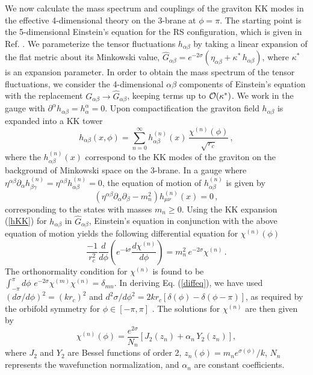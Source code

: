 We now calculate the mass spectrum and couplings of the graviton 
KK modes in the effective 4-dimensional theory on the 3-brane at $\phi = \pi$.  
The starting point is the 5-dimensional Einstein's equation for the RS
configuration, which is given in Ref. \cite{rs1}.  We parameterize the tensor 
fluctuations $h_{\alpha \beta}$ by taking a linear expansion of the flat 
metric about its Minkowski value, $\hat{G}_{\alpha \beta} = e^{-2 \sigma} 
\left(\eta_{\alpha \beta} + \kappa^* \,  h_{\alpha \beta}\right)$,
where $\kappa^*$ is an expansion parameter.  In order to obtain the mass 
spectrum of the tensor fluctuations, we consider the 4-dimensional
$\alpha \beta$ components of Einstein's equation with the replacement 
$G_{\alpha \beta} \to \hat{G}_{\alpha \beta}$,
keeping terms up to $\cal{O}(\kappa^*)$.  We work in the gauge with 
$\partial^\alpha h_{\alpha\beta} = h^\alpha_\alpha = 0$.  Upon compactification
the graviton field $h_{\alpha \beta}$ is expanded into a KK tower
\begin{equation}
h_{\alpha \beta} (x, \phi) = \sum_{n = 0}^\infty h_{\alpha \beta}^{(n)} (x) \, 
\frac{\chi^{(n)}(\phi)}{\sqrt{r_c}}\,,
\label{hKK}
\end{equation} 
where the $h_{\alpha \beta}^{(n)} (x)$ correspond to the KK modes of the 
graviton on the background of Minkowski space on the 3-brane.  In a gauge where 
$\eta^{\alpha \beta} \partial_\alpha h^{(n)}_{\beta \gamma} = 
\eta^{\alpha \beta} h_{\alpha \beta}^{(n)} = 0$, the equation of motion of 
$h_{\alpha \beta}^{(n)}$ is given by
\begin{equation}
\left(\eta^{\alpha \beta} \partial_\alpha \partial_\beta - m_n^2\right) 
h_{\mu\nu}^{(n)} (x) = 0\,,
\label{eom}
\end{equation}
corresponding to the states with masses $m_n \geq 0$.  
Using the KK expansion (\ref{hKK}) for $h_{\alpha \beta}$ in 
$\hat{G}_{\alpha \beta}$, Einstein's equation  in conjunction with the
above equation of motion yields the following differential equation for 
$\chi^{(n)}(\phi)$
\begin{equation}
\frac{- 1}{r_c^2} \frac{d}{d \phi} \left(e^{- 4 \sigma} \frac{d \chi^{(n)}}{d 
\phi}\right) = m_n^2 \, e^{- 2 \sigma} \chi^{(n)}\,.        
\label{diffeq}
\end{equation}
The orthonormality condition for $\chi^{(n)}$ is found to be
$\int_{- \pi}^{\pi}d\phi\, \, e^{-2\sigma}\chi^{(m)}\chi^{(n)}=\delta_{m n}$.
In deriving Eq. (\ref{diffeq}), we have used $\left(d\sigma/d\phi\right)^2= 
(kr_c)^2$ and $d^2\sigma/d\phi^2=2kr_c\left[\delta(\phi)-\delta 
(\phi-\pi)\right]$, as required by the orbifold symmetry for 
$\phi\in [- \pi,\pi]$ \cite{rs1}.  The solutions for $\chi^{(n)}$ are then
given by\cite{gw1}
\begin{equation}
\chi^{(n)}(\phi) = \frac{e^{2 \sigma}}{N_n} \left[J_2 (z_n) + \alpha_n \, Y_2 
(z_n)\right], 
\label{chi}
\end{equation}
where $J_2$ and $Y_2$ are Bessel functions of order 2, $z_n (\phi) = 
m_n e^{\sigma (\phi)}/k$, $N_n$ represents the wavefunction normalization,
and $\alpha_n$ are constant coefficients. 

